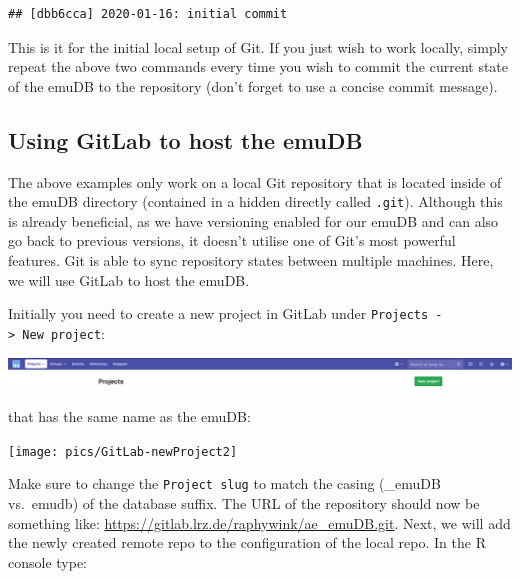 \documentclass[]{book}
\newenvironment{Shaded}{\begin{snugshade}}{\end{snugshade}}
\newcommand{\DataTypeTok}[1]{\textcolor[rgb]{0.13,0.29,0.53}{#1}}
\newcommand{\KeywordTok}[1]{\textcolor[rgb]{0.13,0.29,0.53}{\textbf{#1}}}
\newcommand{\NormalTok}[1]{#1}
\newcommand{\OperatorTok}[1]{\textcolor[rgb]{0.81,0.36,0.00}{\textbf{#1}}}
\newcommand{\StringTok}[1]{\textcolor[rgb]{0.31,0.60,0.02}{#1}}
\begin{document}
\begin{verbatim}
## [dbb6cca] 2020-01-16: initial commit
\end{verbatim}

This is it for the initial local setup of Git. If you just wish to work locally, simply repeat the above two commands every time you wish to commit the current state of the emuDB to the repository (don't forget to use a concise commit message).

\hypertarget{using-gitlab-to-host-the-emudb}{%
\subsection{Using GitLab to host the emuDB}\label{using-gitlab-to-host-the-emudb}}

The above examples only work on a local Git repository that is located inside of the emuDB directory (contained in a hidden directly called \texttt{.git}). Although this is already beneficial, as we have versioning enabled for our emuDB and can also go back to previous versions, it doesn't utilise one of Git's most powerful features. Git is able to sync repository states between multiple machines. Here, we will use GitLab to host the emuDB.

Initially you need to create a new project in GitLab under \texttt{Projects\ -\textgreater{}\ New\ project}:

\begin{center}\includegraphics[width=0.75\linewidth]{pics/GitLab-newProject1} \end{center}

that has the same name as the emuDB:

\begin{center}\texttt{[image: pics/GitLab-newProject2]} \end{center}

Make sure to change the \texttt{Project\ slug} to match the casing (\_emuDB vs.~emudb) of the database suffix. The URL of the repository should now be something like: \url{https://gitlab.lrz.de/raphywink/ae_emuDB.git}. Next, we will add the newly created remote repo to the configuration of the local repo. In the R console type:

\begin{Shaded}
\end{Shaded}
\end{document}

